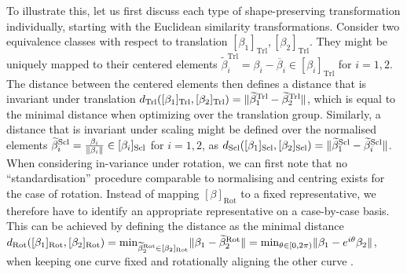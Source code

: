 To illustrate this, let us first discuss each type of shape-preserving transformation individually, starting with the Euclidean similarity transformations.
Consider two equivalence classes with respect to translation $[\beta_1]_\text{Trl}, [\beta_2]_\text{Trl}$.
They might be uniquely mapped to their centered elements $\widetilde\beta^\text{Trl}_i = \beta_i - \overline{\beta}_i \in [\beta_i]_\text{Trl}$ for $i=1,2$.
The distance between the centered elements then defines a distance that is invariant under translation $d_\text{Trl}([\beta_1]_\text{Trl}, [\beta_2]_\text{Trl}) = \lVert\widetilde\beta^\text{Trl}_1 - \widetilde\beta^\text{Trl}_2\rVert$, which is equal to the minimal distance when optimizing over the translation group.
Similarly, a distance that is invariant under scaling might be defined over the normalised elements $\widetilde\beta^\text{Scl}_i = \frac{\beta_i}{\lVert\beta_i\rVert} \in [\beta_i]_\text{Scl}$ for $i = 1,2$, as $d_\text{Scl}([\beta_1]_\text{Scl}, [\beta_2]_\text{Scl}) = \lVert\widetilde\beta^\text{Scl}_1 - \widetilde\beta^\text{Scl}_i\rVert$.
When considering in-variance under rotation, we can first note that no \enquote{standardisation} procedure comparable to normalising and centring exists for the case of rotation.
Instead of mapping $[\beta]_\text{Rot}$ to a fixed representative, we therefore have to identify an appropriate representative on a case-by-case basis.
This can be achieved by defining the distance as the minimal distance $d_\text{Rot}([\beta_1]_\text{Rot}, [\beta_2]_\text{Rot}) = \min_{\widetilde\beta^\text{Rot}_2 \in [\beta_2]_\text{Rot}} \lVert\beta_1 - \widetilde\beta^\text{Rot}_2\rVert = \min_{\theta \in [0,2\pi)} \lVert\beta_1 - e^{i\theta}\beta_2\rVert$, when keeping one curve fixed and rotationally aligning the other curve \parencite[see e.g][]{Stoecker2021}.


